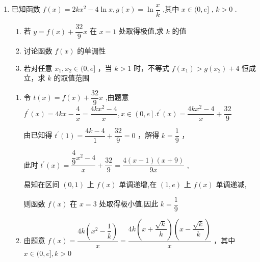 \begin{enumerate}
\begin{enumerate}
\begin{jieda}
            结合图象可知$a = 2$.
        \end{jieda}
        \item 已知函数 $f\left( x\right)  = {2k}{x}^{2} - 4\ln x,g\left( x\right)  = \ln \dfrac{x}{k}$ ,其中 $x \in  (0,{e}\rbrack$ , $k > 0$ .
        \begin{enumerate}
            \item 若 $y = f\left( x\right)  + \dfrac{32}{9}x$ 在 $x = 1$ 处取得极值,求 $k$ 的值
            \item 讨论函数 $f\left( x\right)$ 的单调性
            \item 若对任意 ${x}_{1},{x}_{2} \in  (0,{e}\rbrack$ ，当 $k > 1$ 时，不等式 $f\left( {x}_{1}\right)  > g\left( {x}_{2}\right)  + 4$ 恒成立，求 $k$ 的取值范围
        \end{enumerate}
        \begin{jieda}
            \begin{enumerate}
                \item 令 $t\left( x\right)  = f\left( x\right)  + \dfrac{32}{9}x$ ,由题意 ${f}^{\prime }\left( x\right)  = {4kx} - \dfrac{4}{x} = \dfrac{{4k}{x}^{2} - 4}{x},x \in  \left( {0,{e}}\right\rbrack  .{t}^{\prime }\left( x\right)  = \dfrac{{4k}{x}^{2} - 4}{x} + \dfrac{32}{9}$
                
                由已知得 ${t}^{\prime }\left( 1\right)  = \dfrac{{4k} - 4}{1} + \dfrac{32}{9} = 0$ ，解得 $k = \dfrac{1}{9}$ ，
                
                此时 ${t}^{\prime }\left( x\right)  = \dfrac{\dfrac{4}{9}{x}^{2} - 4}{x} + \dfrac{32}{9} = \dfrac{4\left( {x - 1}\right) \left( {x + 9}\right) }{9x}$ ,
                
                易知在区间 $\left( {0,1}\right)$ 上 $f\left( x\right)$ 单调递增,在 $\left( {1,{e}}\right)$ 上 $f\left( x\right)$ 单调递减,
                
                则函数 $f\left( x\right)$ 在 $x = 3$ 处取得极小值,因此 $k = \dfrac{1}{9}$
                
                
                \item 由题意 $f\left( x\right)  = \dfrac{{4k}\left( {{x}^{2} - \dfrac{1}{k}}\right) }{x} = \dfrac{{4k}\left( {x + \dfrac{\sqrt{k}}{k}}\right) \left( {x - \dfrac{\sqrt{k}}{k}}\right) }{x}$ ，其中 $x \in  (0,{e}\rbrack ,k > 0$

                

\end{enumerate}
\end{jieda}
\end{enumerate}
\end{enumerate}
